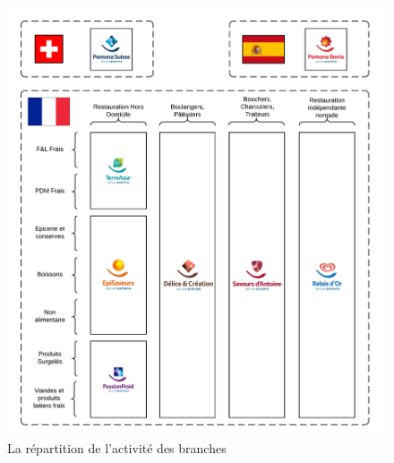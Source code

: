                 \begin{figure}[htpb]
                    \begin{center}
                    \includegraphics[width=\linewidth]{img/La repartition de lactivite des branches.png}
                    \end{center}
                    \caption{La répartition de l'activité des branches}
                    \label{fig:repartition_activite}
                \end{figure}

